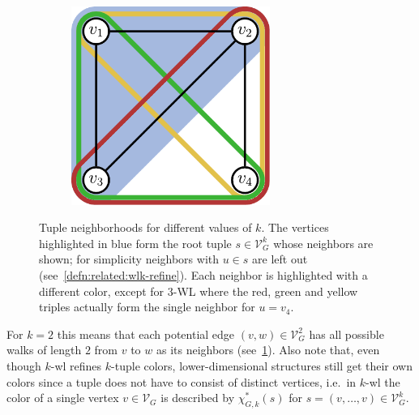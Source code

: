 \begin{figure}[ht]
\begin{subfigure}{0.32\textwidth}
		\label{fig:related:wl-neighbors:2}
	\end{subfigure}%
	\begin{subfigure}{0.36\textwidth}
		\centering
		\includegraphics[width=0.711\textwidth]{gfx/related-work/wl3-neighbors.pdf}
		\label{fig:related:wl-neighbors:3}
	\end{subfigure}
	\caption[\ac{wl} neighborhoods for different values of $k$.]{
		Tuple neighborhoods for different values of $k$.
		The vertices highlighted in \textcolor{t_blue}{blue} form the root tuple $s \in \mathcal{V}_G^k$ whose neighbors are shown;
		for simplicity neighbors with $u \in s$ are left out (see~\cref{defn:related:wlk-refine}).
		Each neighbor is highlighted with a different color, except for 3-WL where the \textcolor{t_red}{red}, \textcolor{t_darkgreen}{green} and \textcolor{t_darkyellow}{yellow} triples actually form the single neighbor for $u = v_4$.
	}\label{fig:related:wl-neighbors}
\end{figure}
For $k = 2$ this means that each potential edge $(v, w) \in \mathcal{V}_G^2$ has all possible walks of length $2$ from $v$ to $w$ as its neighbors (see~\cref{fig:related:wl-neighbors:2}).
Also note that, even though $k$-\acs{wl} refines $k$-tuple colors, lower-dimensional structures still get their own colors since a tuple does not have to consist of distinct vertices, i.e.\ in $k$-\acs{wl} the color of a single vertex $v \in \mathcal{V}_G$ is described by $\chi^{*}_{G, k}(s)$ for $s = (v, \dots, v) \in \mathcal{V}_G^k$.

